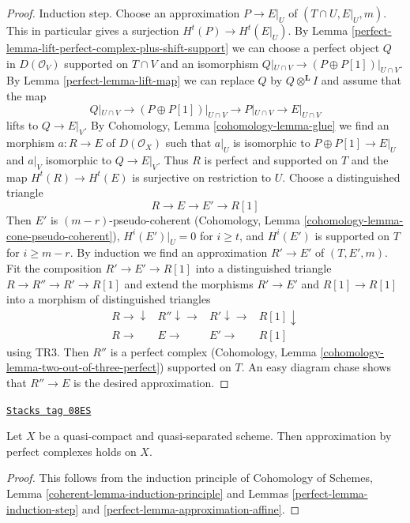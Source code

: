 \begin{proof}
\medskip\noindent
Induction step. Choose an approximation $P \to E|_U$
of $(T \cap U, E|_U, m)$. This in particular gives a surjection
$H^t(P) \to H^t(E|_U)$. By
Lemma \ref{perfect-lemma-lift-perfect-complex-plus-shift-support}
we can choose a perfect object $Q$ in $D(\mathcal{O}_V)$
supported on $T \cap V$ and an isomorphism
$Q|_{U \cap V} \to (P \oplus P[1])|_{U \cap V}$.
By Lemma \ref{perfect-lemma-lift-map} we can replace $Q$ by
$Q \otimes^\mathbf{L} I$
and assume that the map
$$
Q|_{U \cap V} \to (P \oplus P[1])|_{U \cap V}
\longrightarrow P|_{U \cap V}
\longrightarrow
E|_{U \cap V}
$$
lifts to $Q \to E|_V$. By
Cohomology, Lemma \ref{cohomology-lemma-glue}
we find an morphism $a : R \to E$ of $D(\mathcal{O}_X)$
such that $a|_U$ is isomorphic to $P \oplus P[1] \to E|_U$
and $a|_V$ isomorphic to $Q \to E|_V$.
Thus $R$ is perfect and supported on $T$
and the map $H^t(R) \to H^t(E)$ is surjective on restriction to $U$.
Choose a distinguished triangle
$$
R \to E \to E' \to R[1]
$$
Then $E'$ is $(m - r)$-pseudo-coherent
(Cohomology, Lemma \ref{cohomology-lemma-cone-pseudo-coherent}),
$H^i(E')|_U = 0$ for $i \geq t$, and
$H^i(E')$ is supported on $T$ for $i \geq m - r$.
By induction we find an approximation $R' \to E'$
of $(T, E', m)$. Fit the composition $R' \to E' \to R[1]$
into a distinguished triangle $R \to R'' \to R' \to R[1]$
and extend the morphisms $R' \to E'$ and $R[1] \to R[1]$ into
a morphism of distinguished triangles
$$
\begin{array}{cccc}R \longrightarrow\downarrow & R'' \downarrow\longrightarrow & R' \downarrow\longrightarrow & R[1] \downarrow \\ R \longrightarrow & E \longrightarrow & E' \longrightarrow & R[1]\end{array}
$$
using TR3. Then $R''$ is a perfect complex
(Cohomology, Lemma \ref{cohomology-lemma-two-out-of-three-perfect})
supported on $T$.
An easy diagram chase shows that $R'' \to E$ is the desired
approximation.
\end{proof}

\begin{theorem}[Approximation]
\label{perfect-theorem-approximation}
\href{https://stacks.math.columbia.edu/tag/08ES}{\texttt{Stacks tag 08ES}}

Let $X$ be a quasi-compact and quasi-separated scheme.
Then approximation by perfect complexes holds on $X$.
\end{theorem}

\begin{proof}

This follows from the induction principle of
Cohomology of Schemes, Lemma \ref{coherent-lemma-induction-principle}
and Lemmas \ref{perfect-lemma-induction-step} and \ref{perfect-lemma-approximation-affine}.
\end{proof}

